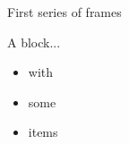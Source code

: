 \documentclass{beamer}
\newcommand{\framesection}[1]{
    \def\insertframesection{#1}
}
\begin{document}
\framesection{First series of frames}

\begin{frame}{\insertframesection}
\begin{block}{A block...}
    \begin{itemize}
      \item with 
      \item some
      \item items
    \end{itemize}
\end{block}
\end{frame}
\end{document}
